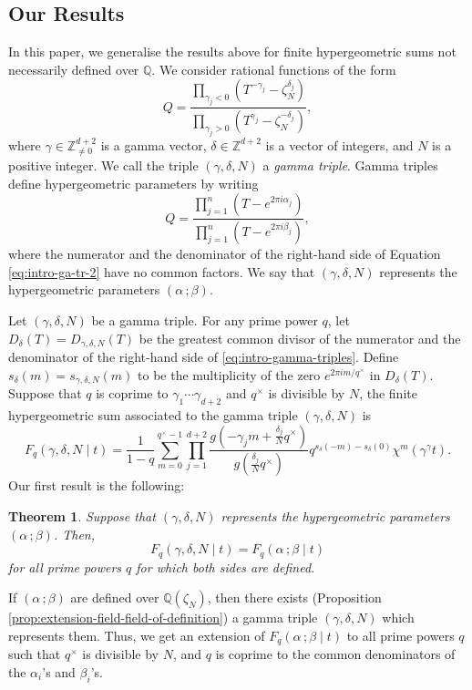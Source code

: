 \documentclass[11pt, reqno]{amsart}
\theoremstyle{plain}
\newtheorem{theo}{Theorem}[section]
\theoremstyle{definition}
\newcommand{\Z}{\mathbb{Z}}
\newcommand{\Q}{\mathbb{Q}}
\newcommand{\ga}{\gamma}
\newcommand{\be}{\beta}
\newcommand{\al}{\alpha}
\begin{document}
\subsection{Our Results} In this paper, we generalise the results above for finite hypergeometric sums not necessarily defined over $\Q$.
We consider rational functions of the form
\begin{equation}\label{eq:intro-gamma-triples}
    Q = \frac{ \prod_{\ga_j< 0} \left(T^{-\ga_j} - \zeta_{N}^{\delta_j}\right) }{ \prod_{\ga_j>0}\left( T^{\ga_j} - \zeta_{N}^{-\delta_j}\right)},
\end{equation}
where $\ga \in \Z^{d+2}_{\neq0 }$ is a gamma vector, $\delta \in \Z^{d+2}$ is a vector of integers, and $N$ is a positive integer. We call the triple $(\ga, \delta,N)$ a \emph{gamma triple}. Gamma triples define hypergeometric parameters by writing 
\begin{equation}\label{eq:intro-ga-tr-2}
Q = \frac{\prod_{j=1}^n (T- e^{2\pi i \al_j} )}{\prod_{j=1}^n (T- e^{2\pi i \be_j})},  
\end{equation}
where the numerator and the denominator of the right-hand side of Equation \eqref{eq:intro-ga-tr-2} have no common factors. We say that $(\ga,\delta,N)$ represents the hypergeometric parameters $(\al \, ; \be)$. 

Let $(\ga,\delta,N)$ be a gamma triple. 
For any prime power $q$, let $D_{\delta}(T)=D_{\ga,\delta,N}(T)$ be the greatest common divisor of the numerator and the denominator of the right-hand side of \eqref{eq:intro-gamma-triples}. Define $s_{\delta}(m)=s_{\ga,\delta,N}(m)$ to be the multiplicity of the zero $e^{2 \pi i m/q^\times}$ in $D_{\delta}(T)$.
Suppose that $q$ is coprime to $\ga_1 \cdots \ga_{d+2}$ and $q^\times$ is divisible by $N$, the finite hypergeometric sum associated to the gamma triple $(\ga,\delta,N)$ is
\begin{equation}
F_q\left(\gamma, \delta,N \mid t\right) = \frac{1}{1-q}\sum_{m=0}^{q^\times-1} \prod_{j=1}^{d+2} \frac{g\left(-\gamma_j m +\frac{\delta_j}{N} q^\times\right)} {g\left(\frac{\delta_j}{N} q^\times\right)}  q^{s_{\delta}(-m)-s_{\delta}(0)} \chi^m(\gamma^{\gamma}t). \label{eq:intro-1}
\end{equation}
Our first result is the following:
\begin{theo} 
Suppose that $(\ga,\delta,N)$ represents the hypergeometric parameters $(\al \, ; \be)$. Then,
\[
F_q\left(\gamma, \delta,N \mid t\right)  = F_q( \al \, ; \be \mid t)
\]
for all prime powers $q$ for which both sides are defined.  
\end{theo}
If $(\al \, ; \be)$ are defined over $\Q(\zeta_N)$, then there exists (Proposition \ref{prop:extension-field-field-of-definition}) a gamma triple $(\ga,\delta,N)$ which represents them.  Thus, we get an extension of $F_q(\al \, ; \be \mid t)$ to all prime powers $q$ such that $q^\times$ is divisible by $N$, and $q$ is coprime to the common denominators of the $\al_i$'s and $\beta_i$'s.
\end{document}
